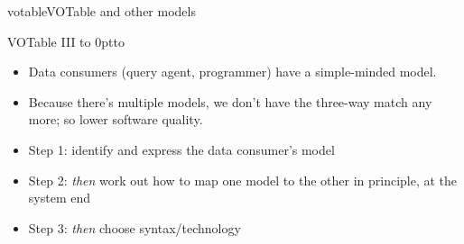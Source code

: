 \documentclass[pdf,final,norman]{prosper}
\newenvironment{myslide}[1]{\begin{slide}{#1}\slidetoc{#1}}{\end{slide}}
\begin{document}
\begin{slidegroup}{votable}{VOTable and other models}
\begin{myslide}{VOTable III}
\vbox to 0pt{\hbox to \vss}
\begin{itemize}
\item \begin{minipage}{0.5\hsize}
      \raggedright
      Data consumers (query agent, programmer) have a simple-minded model.
      \end{minipage}
\item \begin{minipage}{0.5\hsize}
      \raggedright
      Because there's multiple models, we
      don't have the three-way match any more; so lower software
      quality.
      \end{minipage}
\item Step 1: identify and express the data consumer's model
\item Step 2: \emph{then} work out how to map one model to the other
in principle, at the system end
\item Step 3: \emph{then} choose syntax/technology
\end{itemize}
\end{myslide}

\end{slidegroup}

\end{document}
